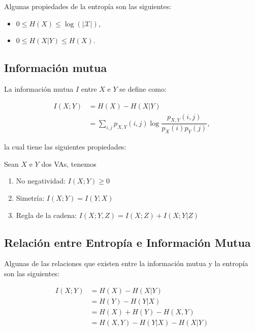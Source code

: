 \begin{prop}
Algunas propiedades de la entropía son las siguientes:

\begin{itemize}
    \item $0\leq H(X)\leq \log (|\mathcal{X}|)$,
    \item $0\leq H(X|Y)\leq H(X)$.
\end{itemize}

\end{prop}

\subsection{Información mutua}

La información mutua $I$ entre $X$ e $Y$ se define como:

\begin{align*}
    I(X;Y)&=H(X)-H(X|Y)\\
    &=\sum\limits_{i,j}p_{X,Y}(i,j)\log \dfrac{p_{X,Y}(i,j)}{p_X(i)p_Y(j)},
\end{align*}

la cual tiene las siguientes propiedades:

\begin{prop}
Sean $X$ e $Y$ dos VAs, tenemos

\begin{enumerate}
    \item No negatividad: $I(X;Y)\geq 0$
    \item Simetría: $I(X;Y)=I(Y;X)$
    \item Regla de la cadena: $I(X;Y,Z)=I(X;Z)+I(X;Y|Z)$
\end{enumerate}

\end{prop}

\subsection{Relación entre Entropía e Información Mutua}

Algunas de las relaciones que existen entre la información mutua y la entropía son las siguientes:

\begin{align*}
    I(X;Y)&= H(X)-H(X|Y)\\
    &= H(Y)-H(Y|X)\\
    &= H(X)+H(Y)-H(X,Y)\\
    &= H(X,Y)-H(Y|X)-H(X|Y)
\end{align*}

